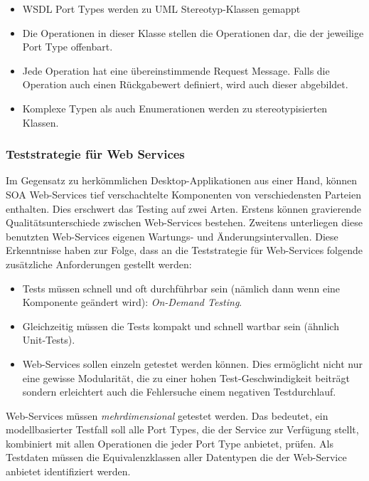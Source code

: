 \begin{itemize}
\item WSDL Port Types werden zu UML Stereotyp-Klassen gemappt
\item Die Operationen in dieser Klasse stellen die Operationen dar, die der jeweilige Port Type offenbart.
\item Jede Operation hat eine übereinstimmende Request Message. Falls die Operation auch einen Rückgabewert definiert, wird auch dieser abgebildet.
\item Komplexe Typen als auch Enumerationen werden zu stereotypisierten Klassen.
\end{itemize}

\subsubsection{Teststrategie für Web Services}
Im Gegensatz zu herkömmlichen Desktop-Applikationen aus einer Hand, können SOA Web-Services tief verschachtelte Komponenten von verschiedensten Parteien enthalten. Dies erschwert das Testing auf zwei Arten. Erstens können gravierende Qualitätsunterschiede zwischen Web-Services bestehen. Zweitens unterliegen diese benutzten Web-Services eigenen Wartungs- und Änderungsintervallen. Diese Erkenntnisse haben zur Folge, dass an die Teststrategie für Web-Services folgende zusätzliche Anforderungen gestellt werden:

\begin{itemize}
\item Tests müssen schnell und oft durchführbar sein (nämlich dann wenn eine Komponente geändert wird): \textit{On-Demand Testing}.
\item Gleichzeitig müssen die Tests kompakt und schnell wartbar sein (ähnlich Unit-Tests).
\item Web-Services sollen einzeln getestet werden können. Dies ermöglicht nicht nur eine gewisse Modularität, die zu einer hohen Test-Geschwindigkeit beiträgt sondern erleichtert auch die Fehlersuche einem negativen Testdurchlauf.
\end{itemize}

Web-Services müssen \textit{mehrdimensional} getestet werden\cite{_model-driven_2007}. Das bedeutet, ein modellbasierter Testfall soll alle Port Types, die der Service zur Verfügung stellt, kombiniert mit allen Operationen die jeder Port Type anbietet, prüfen. Als Testdaten müssen die Equivalenzklassen aller Datentypen die der Web-Service anbietet identifiziert werden.

